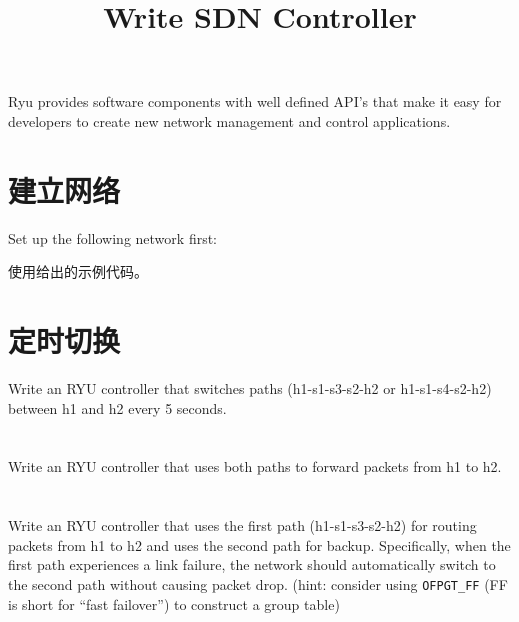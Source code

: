 \endofdump
{}

    \title{Write SDN Controller}
    \maketitle
    \tableofcontents
    \vfill
    Ryu provides software components with well defined API's that make it easy for developers to create new network management and control applications.
    \vfill
    \clearpage
    \section{建立网络}
    Set up the following network first:
    
    \hfill
    

    使用给出的示例代码。

    \section{定时切换}
    Write an RYU controller that switches paths (h1-s1-s3-s2-h2 or h1-s1-s4-s2-h2) between h1 and h2 every 5 seconds. 

    

    \section{}
    Write an RYU controller that uses both paths to forward packets from h1 to h2.

    \section{}
    Write an RYU controller that uses the first path (h1-s1-s3-s2-h2) for routing packets from h1 to h2 and uses the second path for backup. Specifically, when the first path experiences a link failure, the network should automatically switch to the second path without causing packet drop. (hint: consider using \verb"OFPGT_FF" (FF is short for ``fast failover'') to construct a group table)

